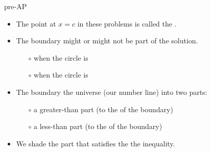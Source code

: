 \begin{taggedblock}{pre-AP}
\begin{center}
    \begin{tcolorbox}[width=6in]
        \begin{itemize}
            \item The point at $x=c$ in these problems is called the .
            \item The boundary might or might not be part of the solution.
                \begin{itemize}
                    \item[$\circ$]  when the circle is 
                    \item[$\circ$]  when the circle is 
                \end{itemize}
            \item The boundary  the universe (our number line) into two parts:
                \begin{itemize}
                    \item[$\circ$] a greater-than part (to the  of the boundary)
                    \item[$\circ$] a less-than part (to the  of the boundary)
                \end{itemize}
            \item We shade the part that satisfies the the inequality.
        \end{itemize}
    \end{tcolorbox}
\end{center}



\end{taggedblock}